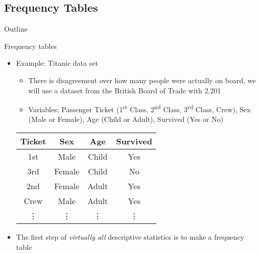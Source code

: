 \documentclass[xcolor=dvipsnames]{beamer}
\begin{document}
\subsection{Frequency Tables}
\begin{frame}{Outline}
\tableofcontents[currentsection,subsectionstyle=show/shaded/hide]
\end{frame}

\begin{frame}{Frequency tables}
	\begin{itemize}
		\item Example: Titanic data set \pause
		\begin{itemize}
			\item There is disagreement over how many people were actually on board, we will use a dataset from the British Board of Trade with 2,201 \pause
			\item Variables: Passenger Ticket (1\textsuperscript{st} Class, 2\textsuperscript{nd} Class, 3\textsuperscript{rd} Class, Crew), Sex (Male or Female), Age (Child or Adult), Survived (Yes or No)
		\end{itemize}
	\begin{center}
				\begin{tabular}{|c|c|c|c|}
			\hline 
			\textbf{Ticket} & \textbf{Sex} & \textbf{Age} & \textbf{Survived}  \\ 
			\hline \hline
			1st & Male & Child & Yes \\ 
			\hline 
			3rd & Female & Child & No \\ 
			\hline 
			2nd & Female & Adult & Yes \\ 
			\hline 
			Crew & Male & Adult & Yes \\ 
			\hline
			\vdots & \vdots & \vdots & \vdots \\
			\hline 
		\end{tabular} 
	\end{center} \pause
		\item The first step of \emph{virtually all} descriptive statistics is to make a frequency table
	\end{itemize}
\end{frame}
\end{document}

